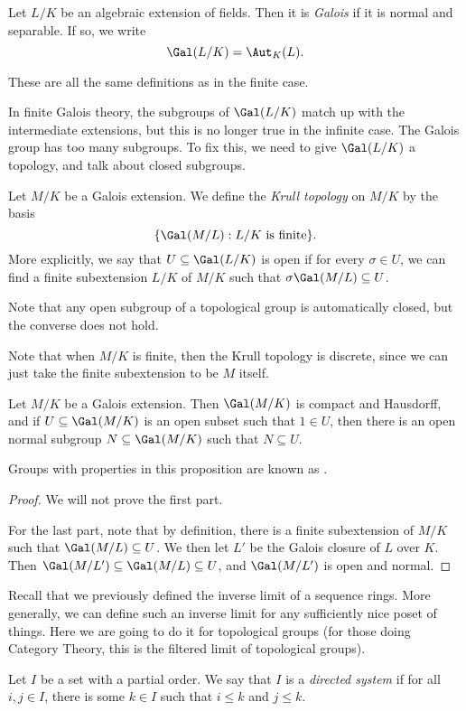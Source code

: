 \documentclass[a4paper]{article}
\begin{document}
\begin{defi}
  Let $L/K$ be an algebraic extension of fields. Then it is \emph{Galois} if it is normal and separable. If so, we write
  \[
    \Gal(L/K) = \Aut_K(L).
  \]
\end{defi}
These are all the same definitions as in the finite case.

In finite Galois theory, the subgroups of $\Gal(L/K)$ match up with the intermediate extensions, but this is no longer true in the infinite case. The Galois group has too many subgroups. To fix this, we need to give $\Gal(L/K)$ a topology, and talk about closed subgroups.

\begin{defi}
  Let $M/K$ be a Galois extension. We define the \emph{Krull topology} on $M/K$ by the basis
  \[
    \{\Gal(M/L): L/K\text{ is finite}\}.
  \]
  More explicitly, we say that $U \subseteq \Gal(L/K)$ is open if for every $\sigma \in U$, we can find a finite subextension $L/K$ of $M/K$ such that $\sigma \Gal(M/L) \subseteq U$.
\end{defi}
Note that any open subgroup of a topological group is automatically closed, but the converse does not hold.

Note that when $M/K$ is finite, then the Krull topology is discrete, since we can just take the finite subextension to be $M$ itself.

\begin{prop}
  Let $M/K$ be a Galois extension. Then $\Gal(M/K)$ is compact and Hausdorff, and if $U \subseteq \Gal(M/K)$ is an open subset such that $1 \in U$, then there is an open normal subgroup $N \subseteq \Gal(M/K)$ such that $N \subseteq U$.
\end{prop}
Groups with properties in this proposition are known as .

\begin{proof}
  We will not prove the first part.

  For the last part, note that by definition, there is a finite subextension of $M/K$ such that $\Gal(M/L) \subseteq U$. We then let $L'$ be the Galois closure of $L$ over $K$. Then $\Gal(M/L') \subseteq \Gal(M/L) \subseteq U$, and $\Gal(M/L')$ is open and normal.
\end{proof}

Recall that we previously defined the inverse limit of a sequence rings. More generally, we can define such an inverse limit for any sufficiently nice poset of things. Here we are going to do it for topological groups (for those doing Category Theory, this is the filtered limit of topological groups).
\begin{defi}
  Let $I$ be a set with a partial order. We say that $I$ is a \emph{directed system} if for all $i, j \in I$, there is some $k \in I$ such that $i \leq k$ and $j \leq k$.
\end{defi}
\end{document}
